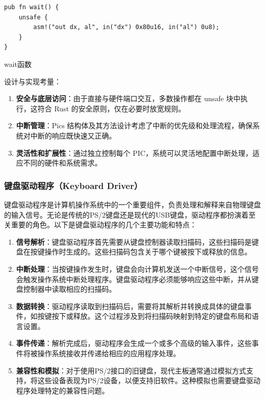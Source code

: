 \begin{listing}[htbp]
    \begin{verbatim}
pub fn wait() {
    unsafe {
        asm!("out dx, al", in("dx") 0x80u16, in("al") 0u8);
    }
}
    \end{verbatim}
    \caption{wait函数}\label{lst:PicWaitFunction}
\end{listing}

设计与实现考量：

\begin{enumerate}
    \item \textbf{安全与底层访问}：由于直接与硬件端口交互，多数操作都在 unsafe 块中执行，这符合 Rust 的安全原则，仅在必要时放宽规则。
    \item \textbf{中断管理}：Pics 结构体及其方法设计考虑了中断的优先级和处理流程，确保系统对中断的响应既快速又正确。
    \item \textbf{灵活性和扩展性}：通过独立控制每个 PIC，系统可以灵活地配置中断处理，适应不同的硬件和系统需求。
\end{enumerate}

\subsubsection{键盘驱动程序（Keyboard Driver）}

键盘驱动程序是计算机操作系统中的一个重要组件，负责处理和解释来自物理键盘的输入信号。无论是传统的PS/2键盘还是现代的USB键盘，驱动程序都扮演着至关重要的角色。以下是键盘驱动程序的几个主要功能和特点：

\begin{enumerate}
    \item \textbf{信号解析}：键盘驱动程序首先需要从键盘控制器读取扫描码，这些扫描码是键盘在按键操作时生成的。这些扫描码包含关于哪个键被按下或释放的信息。
    \item \textbf{中断处理}：当按键操作发生时，键盘会向计算机发送一个中断信号，这个信号会触发操作系统中断处理程序。键盘驱动程序必须能够响应这些中断，并从键盘控制器中读取相应的扫描码。
    \item \textbf{数据转换}：驱动程序读取到扫描码后，需要将其解析并转换成具体的键盘事件，如按键按下或释放。这个过程涉及到将扫描码映射到特定的键盘布局和语言设置。
    \item \textbf{事件传递}：解析完成后，驱动程序会生成一个或多个高级的输入事件，这些事件将被操作系统接收并传递给相应的应用程序处理。
    \item \textbf{兼容性和模拟}：对于使用PS/2接口的旧键盘，现代主板通常通过模拟方式支持，将这些设备表现为PS/2设备，以便支持旧软件。这种模拟也需要键盘驱动程序处理特定的兼容性问题。
\end{enumerate}

